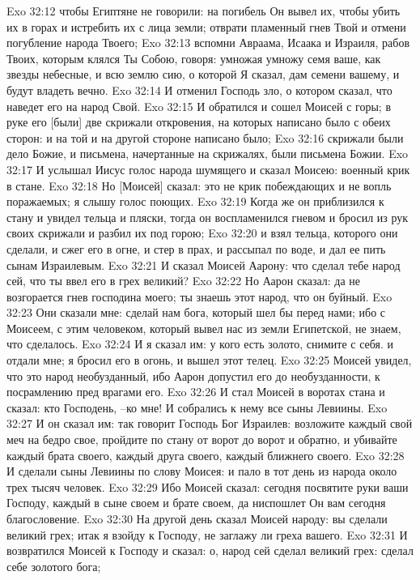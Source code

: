 Exo 32:12  чтобы Египтяне не говорили: на погибель Он вывел их, чтобы убить их в горах и истребить их с лица земли; отврати пламенный гнев Твой и отмени погубление народа Твоего;
Exo 32:13  вспомни Авраама, Исаака и Израиля, рабов Твоих, которым клялся Ты Собою, говоря: умножая умножу семя ваше, как звезды небесные, и всю землю сию, о которой Я сказал, дам семени вашему, и будут владеть вечно.
Exo 32:14  И отменил Господь зло, о котором сказал, что наведет его на народ Свой.
Exo 32:15  И обратился и сошел Моисей с горы; в руке его [были] две скрижали откровения, на которых написано было с обеих сторон: и на той и на другой стороне написано было;
Exo 32:16  скрижали были дело Божие, и письмена, начертанные на скрижалях, были письмена Божии.
Exo 32:17  И услышал Иисус голос народа шумящего и сказал Моисею: военный крик в стане.
Exo 32:18  Но [Моисей] сказал: это не крик побеждающих и не вопль поражаемых; я слышу голос поющих.
Exo 32:19  Когда же он приблизился к стану и увидел тельца и пляски, тогда он воспламенился гневом и бросил из рук своих скрижали и разбил их под горою;
Exo 32:20  и взял тельца, которого они сделали, и сжег его в огне, и стер в прах, и рассыпал по воде, и дал ее пить сынам Израилевым.
Exo 32:21  И сказал Моисей Аарону: что сделал тебе народ сей, что ты ввел его в грех великий?
Exo 32:22  Но Аарон сказал: да не возгорается гнев господина моего; ты знаешь этот народ, что он буйный.
Exo 32:23  Они сказали мне: сделай нам бога, который шел бы перед нами; ибо с Моисеем, с этим человеком, который вывел нас из земли Египетской, не знаем, что сделалось.
Exo 32:24  И я сказал им: у кого есть золото, снимите с себя. и отдали мне; я бросил его в огонь, и вышел этот телец.
Exo 32:25  Моисей увидел, что это народ необузданный, ибо Аарон допустил его до необузданности, к посрамлению пред врагами его.
Exo 32:26  И стал Моисей в воротах стана и сказал: кто Господень, --ко мне! И собрались к нему все сыны Левиины.
Exo 32:27  И он сказал им: так говорит Господь Бог Израилев: возложите каждый свой меч на бедро свое, пройдите по стану от ворот до ворот и обратно, и убивайте каждый брата своего, каждый друга своего, каждый ближнего своего.
Exo 32:28  И сделали сыны Левиины по слову Моисея: и пало в тот день из народа около трех тысяч человек.
Exo 32:29  Ибо Моисей сказал: сегодня посвятите руки ваши Господу, каждый в сыне своем и брате своем, да ниспошлет Он вам сегодня благословение.
Exo 32:30  На другой день сказал Моисей народу: вы сделали великий грех; итак я взойду к Господу, не заглажу ли греха вашего.
Exo 32:31  И возвратился Моисей к Господу и сказал: о, народ сей сделал великий грех: сделал себе золотого бога;
